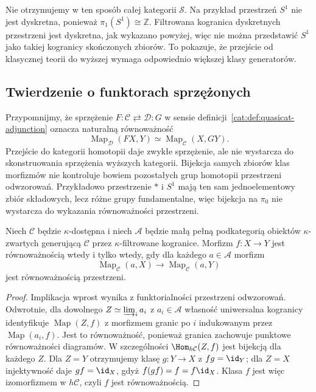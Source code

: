 \begin{przyklad}
Nie otrzymujemy w ten sposób całej kategorii $\mathcal S$. Na przykład przestrzeń $S^1$ nie jest dyskretna, ponieważ $\pi_1(S^1)\cong\mathbb Z$. Filtrowana kogranica dyskretnych przestrzeni jest dyskretna, jak wykazano powyżej, więc nie można przedstawić $S^1$ jako takiej kogranicy skończonych zbiorów. To pokazuje, że przejście od klasycznej teorii do wyższej wymaga odpowiednio większej klasy generatorów.
\end{przyklad}

\subsection{Twierdzenie o funktorach sprzężonych}

Przypomnijmy, że sprzężenie $F:\mathcal C\rightleftarrows\mathcal D:G$ w sensie definicji~\ref{cat:def:quasicat-adjunction} oznacza naturalną równoważność
\[
 \operatorname{Map}_{\mathcal D}(FX,Y)\simeq
 \operatorname{Map}_{\mathcal C}(X,GY).
\]
Przejście do kategorii homotopii daje zwykłe sprzężenie, ale nie wystarcza do skonstruowania sprzężenia wyższych kategorii. Bijekcja samych zbiorów klas morfizmów nie kontroluje bowiem pozostałych grup homotopii przestrzeni odwzorowań. Przykładowo przestrzenie $*$ i $S^1$ mają ten sam jednoelementowy zbiór składowych, lecz różne grupy fundamentalne, więc bijekcja na $\pi_0$ nie wystarcza do wykazania równoważności przestrzeni.

\begin{lemat}\label{cat:lem:infty-accessible-detect-equivalence}
Niech $\mathcal C$ będzie $\kappa$-dostępna i niech $\mathcal A$ będzie małą pełną podkategorią obiektów $\kappa$-zwartych generującą $\mathcal C$ przez $\kappa$-filtrowane kogranice. Morfizm $f:X\to Y$ jest równoważnością wtedy i tylko wtedy, gdy dla każdego $a\in\mathcal A$ morfizm
\[
 \operatorname{Map}_{\mathcal C}(a,X)\longrightarrow
 \operatorname{Map}_{\mathcal C}(a,Y)
\]
jest równoważnością przestrzeni.
\end{lemat}
\begin{proof}
Implikacja wprost wynika z funktorialności przestrzeni odwzorowań. Odwrotnie, dla dowolnego $Z\simeq\varinjlim_i a_i$ z $a_i\in\mathcal A$ własność uniwersalna kogranicy identyfikuje $\operatorname{Map}(Z,f)$ z morfizmem granic po $i$ indukowanym przez $\operatorname{Map}(a_i,f)$. Jest to równoważność, ponieważ granica zachowuje punktowe równoważności diagramów. W szczególności $\Hom_{h\mathcal C}(Z,f)$ jest bijekcją dla każdego $Z$. Dla $Z=Y$ otrzymujemy klasę $g:Y\to X$ z $fg=\id_Y$; dla $Z=X$ injektywność daje $gf=\id_X$, gdyż $f(gf)=f=f\id_X$. Klasa $f$ jest więc izomorfizmem w $h\mathcal C$, czyli $f$ jest równoważnością.
\end{proof}

